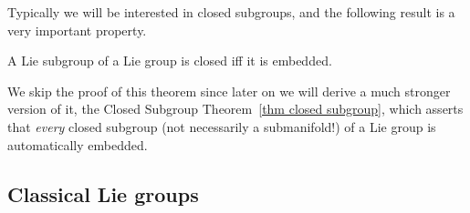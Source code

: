 Typically we will be interested in closed subgroups, and the following result is a very important property.

\begin{thm}\label{thm 7.21 Lee}
    A Lie subgroup of a Lie group is closed iff it is embedded.
\end{thm}

We skip the proof of this theorem since later on we will derive a much stronger version of it, the Closed Subgroup Theorem~\ref{thm closed subgroup}, which asserts that \emph{every} closed subgroup (not necessarily a submanifold!) of a Lie group is automatically embedded.









\subsection{Classical Lie groups}\label{sec: classical groups}


